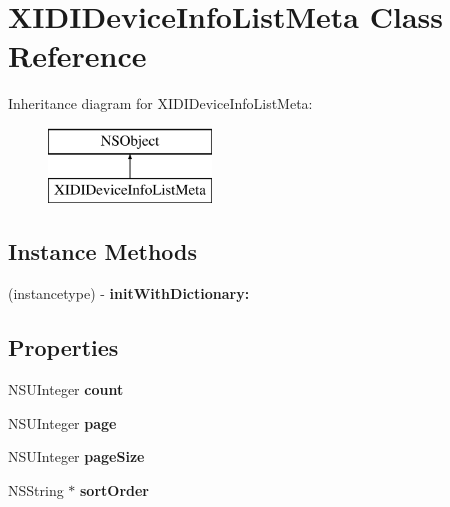 \hypertarget{interface_x_i_d_i_device_info_list_meta}{}\section{X\+I\+D\+I\+Device\+Info\+List\+Meta Class Reference}
\label{interface_x_i_d_i_device_info_list_meta}
Inheritance diagram for X\+I\+D\+I\+Device\+Info\+List\+Meta\+:\begin{figure}[H]
\begin{center}
\leavevmode
\includegraphics[height=2.000000cm]{interface_x_i_d_i_device_info_list_meta}
\end{center}
\end{figure}
\subsection*{Instance Methods}
\begin{DoxyCompactItemize}
\item 
\hypertarget{interface_x_i_d_i_device_info_list_meta_a15caf03e6d3dc7e037f6749e9645e06b}{}\label{interface_x_i_d_i_device_info_list_meta_a15caf03e6d3dc7e037f6749e9645e06b} 
(instancetype) -\/ {\bfseries init\+With\+Dictionary\+:}
\end{DoxyCompactItemize}
\subsection*{Properties}
\begin{DoxyCompactItemize}
\item 
\hypertarget{interface_x_i_d_i_device_info_list_meta_a7507c47c9d7a0a070fd972a0623edc50}{}\label{interface_x_i_d_i_device_info_list_meta_a7507c47c9d7a0a070fd972a0623edc50} 
N\+S\+U\+Integer {\bfseries count}
\item 
\hypertarget{interface_x_i_d_i_device_info_list_meta_ad26f40ed236baf26a52a4bbe2db0fd75}{}\label{interface_x_i_d_i_device_info_list_meta_ad26f40ed236baf26a52a4bbe2db0fd75} 
N\+S\+U\+Integer {\bfseries page}
\item 
\hypertarget{interface_x_i_d_i_device_info_list_meta_a1fbe35cfd1b79774274820aac55645f6}{}\label{interface_x_i_d_i_device_info_list_meta_a1fbe35cfd1b79774274820aac55645f6} 
N\+S\+U\+Integer {\bfseries page\+Size}
\item 
\hypertarget{interface_x_i_d_i_device_info_list_meta_ac68afa5d40b9c34e6e22c496acd0209c}{}\label{interface_x_i_d_i_device_info_list_meta_ac68afa5d40b9c34e6e22c496acd0209c} 
N\+S\+String $\ast$ {\bfseries sort\+Order}
\end{DoxyCompactItemize}


